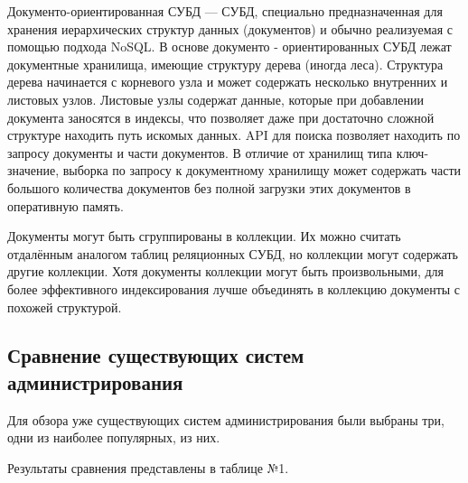 Документо-ориентированная СУБД — СУБД, специально предназначенная для хранения иерархических структур данных (документов) и обычно реализуемая с помощью подхода NoSQL. В основе документо - ориентированных СУБД лежат документные хранилища, имеющие структуру дерева (иногда леса). Структура дерева начинается с корневого узла и может содержать несколько внутренних и листовых узлов. Листовые узлы содержат данные, которые при добавлении документа заносятся в индексы, что позволяет даже при достаточно сложной структуре находить путь искомых данных. API для поиска позволяет находить по запросу документы и части документов. В отличие от хранилищ типа ключ-значение, выборка по запросу к документному хранилищу может содержать части большого количества документов без полной загрузки этих документов в оперативную память.\par
Документы могут быть сгруппированы в коллекции. Их можно считать отдалённым аналогом таблиц реляционных СУБД, но коллекции могут содержать другие коллекции. Хотя документы коллекции могут быть произвольными, для более эффективного индексирования лучше объединять в коллекцию документы с похожей структурой.


\subsection{Сравнение существующих систем администрирования}

Для обзора уже существующих систем администрирования были выбраны три, одни из  наиболее популярных, из них.

Результаты сравнения представлены в таблице №1.



\newpage
